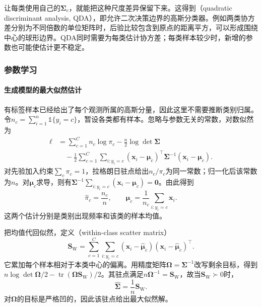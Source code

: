 让每类使用自己的$\bm{\Sigma}_c$，就能把这种尺度差异保留下来。这得到（quadratic discriminant analysis, QDA），即允许二次决策边界的高斯分类器。例如两类协方差分别为不同倍数的单位矩阵时，后验比较包含到原点的距离平方，可以形成围绕中心的球形边界。QDA同时需要为每类估计协方差；每类样本较少时，新增的参数也可能使估计更不稳定。

\subsubsection{参数学习}
\label{sec:classification-lda-learning}

\paragraph{生成模型的最大似然估计}
有标签样本已经给出了每个观测所属的高斯分量，因此这里不需要推断类别归属。令$n_c=\sum_{i=1}^{n}\mathbb{1}\{y_i=c\}$，暂设各类都有样本。忽略与参数无关的常数，对数似然为
\begin{equation}
  \label{eq:classification-lda-likelihood}
  \begin{aligned}
    \ell
      &=\sum_{c=1}^{C}n_c\log\pi_c
        -\frac n2\log\det\bm{\Sigma}\\
      &\quad-\frac12\sum_{c=1}^{C}\sum_{i:y_i=c}
        (\bm{x}_i-\bm{\mu}_c)^{\top}
        \bm{\Sigma}^{-1}(\bm{x}_i-\bm{\mu}_c).
  \end{aligned}
\end{equation}
对先验加入约束$\sum_c\pi_c=1$，拉格朗日驻点给出$n_c/\pi_c$为同一常数；归一化后该常数为$n$。对$\bm{\mu}_c$求导，则有$\bm{\Sigma}^{-1}\sum_{i:y_i=c}(\bm{x}_i-\bm{\mu}_c)=\bm{0}$。由此得到
\begin{equation}
  \label{eq:classification-lda-mean-prior}
  \hat\pi_c=\frac{n_c}{n},\qquad
  \hat{\bm{\mu}}_c=\frac1{n_c}\sum_{i:y_i=c}\bm{x}_i .
\end{equation}
这两个估计分别是类别出现频率和该类的样本均值。

把均值代回似然，定义（within-class scatter matrix）
\begin{equation}
  \label{eq:classification-lda-within}
  \bm{S}_{\mathrm{W}}
    =\sum_{c=1}^{C}\sum_{i:y_i=c}
      (\bm{x}_i-\hat{\bm{\mu}}_c)
      (\bm{x}_i-\hat{\bm{\mu}}_c)^{\top}.
\end{equation}
它累加每个样本相对于本类中心的偏离。用精度矩阵$\bm{\Omega}=\bm{\Sigma}^{-1}$改写剩余目标，得到$n\log\det\bm{\Omega}/2-\operatorname{tr}(\bm{\Omega}\bm{S}_{\mathrm{W}})/2$。其驻点满足$n\bm{\Omega}^{-1}=\bm{S}_{\mathrm{W}}$，故当$\bm{S}_{\mathrm{W}}\succ0$时，
\begin{equation}
  \label{eq:classification-lda-covariance}
  \hat{\bm{\Sigma}}=\frac1n\bm{S}_{\mathrm{W}} .
\end{equation}
对$\bm{\Omega}$的目标是严格凹的，因此该驻点给出最大似然解。

